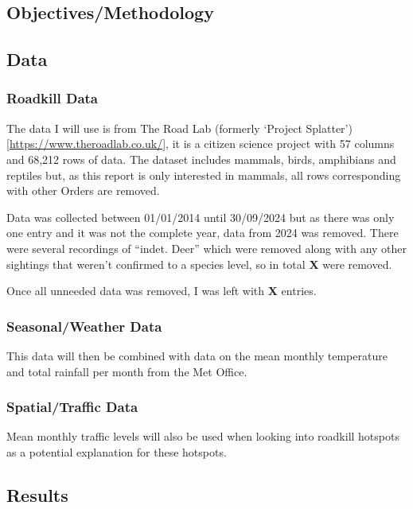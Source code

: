 \documentclass[
]{article}
\begin{document}
\subsection{Objectives/Methodology}\label{objectivesmethodology}

\subsection{Data}\label{data}

\subsubsection{Roadkill Data}\label{roadkill-data}

The data I will use is from The Road Lab (formerly `Project Splatter')
{[}\url{https://www.theroadlab.co.uk/}{]}, it is a citizen science
project with 57 columns and 68,212 rows of data. The dataset includes
mammals, birds, amphibians and reptiles but, as this report is only
interested in mammals, all rows corresponding with other Orders are
removed.

Data was collected between 01/01/2014 until 30/09/2024 but as there was
only one entry and it was not the complete year, data from 2024 was
removed. There were several recordings of ``indet. Deer'' which were
removed along with any other sightings that weren't confirmed to a
species level, so in total \textbf{X} were removed.

Once all unneeded data was removed, I was left with \textbf{X} entries.

\subsubsection{Seasonal/Weather Data}\label{seasonalweather-data}

This data will then be combined with data on the mean monthly
temperature and total rainfall per month from the Met Office.

\subsubsection{Spatial/Traffic Data}\label{spatialtraffic-data}

Mean monthly traffic levels will also be used when looking into roadkill
hotspots as a potential explanation for these hotspots.

\subsection{Results}\label{results}
\end{document}
